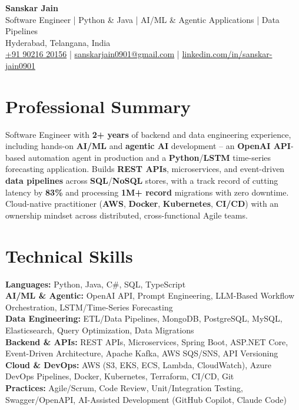\documentclass[a4paper,10pt]{article}
\begin{document}
\begin{center}
    {\LARGE \textbf{Sanskar Jain}} \\
    \vspace{2pt}
    Software Engineer \;|\; Python \& Java \;|\; AI/ML \& Agentic Applications \;|\; Data Pipelines \\
    \vspace{2pt}
    Hyderabad, Telangana, India \\
    \href{tel:+919021620156}{+91 90216 20156} \;|\;
    \href{mailto:sanskarjain0901@gmail.com}{sanskarjain0901@gmail.com} \;|\;
    \href{https://www.linkedin.com/in/sanskar-jain0901/}{linkedin.com/in/sanskar-jain0901}
\end{center}

\section*{Professional Summary}
Software Engineer with \textbf{2+ years} of backend and data engineering experience, including hands-on \textbf{AI/ML} and \textbf{agentic AI} development -- an \textbf{OpenAI API}-based automation agent in production and a \textbf{Python}/\textbf{LSTM} time-series forecasting application.
Builds \textbf{REST APIs}, microservices, and event-driven \textbf{data pipelines} across \textbf{SQL}/\textbf{NoSQL} stores, with a track record of cutting latency by \textbf{83\%} and processing \textbf{1M+ record} migrations with zero downtime.
Cloud-native practitioner (\textbf{AWS}, \textbf{Docker}, \textbf{Kubernetes}, \textbf{CI/CD}) with an ownership mindset across distributed, cross-functional Agile teams.

\section*{Technical Skills}
\begin{sloppypar}
\noindent
\textbf{Languages:} Python, Java, C\#, SQL, TypeScript \\
\textbf{AI/ML \& Agentic:} OpenAI API, Prompt Engineering, LLM-Based Workflow Orchestration, LSTM/Time-Series Forecasting \\
\textbf{Data Engineering:} ETL/Data Pipelines, MongoDB, PostgreSQL, MySQL, Elasticsearch, Query Optimization, Data Migrations \\
\textbf{Backend \& APIs:} REST APIs, Microservices, Spring Boot, ASP.NET Core, Event-Driven Architecture, Apache Kafka, AWS SQS/SNS, API Versioning \\
\textbf{Cloud \& DevOps:} AWS (S3, EKS, ECS, Lambda, CloudWatch), Azure DevOps Pipelines, Docker, Kubernetes, Terraform, CI/CD, Git \\
\textbf{Practices:} Agile/Scrum, Code Review, Unit/Integration Testing, Swagger/OpenAPI, AI-Assisted Development (GitHub Copilot, Claude Code)
\end{sloppypar}
\end{document}
